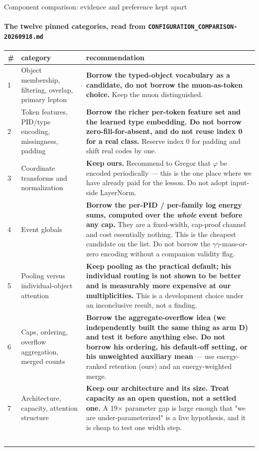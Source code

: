 \documentclass[aspectratio=169,10pt]{beamer}
\begin{document}
\begin{frame}{Component comparison: evidence and preference kept apart}
\framesubtitle{The twelve pinned categories, read from
\texttt{CONFIGURATION\_COMPARISON-20260918.md}}
\begin{center}\tiny
\begin{tabular}{p{0.2cm}p{3.4cm}p{9.4cm}}
\toprule
\# & category & recommendation \\
\midrule
1 & Object membership, filtering, overlap, primary lepton & \textbf{Borrow the typed-object vocabulary as a candidate, do not borrow the muon-as-token choice.} Keep the muon distinguished. \\
2 & Token features, PID/type encoding, missingness, padding & \textbf{Borrow the richer per-token feature set and the learned type embedding. Do not borrow zero-fill-for-absent, and do not reuse index 0 for a real class.} Reserve index 0 for padding and shift real codes by one. \\
3 & Coordinate transforms and normalization & \textbf{Keep ours.} Recommend to Gregor that $\varphi$ be encoded periodically --- this is the one place where we have already paid for the lesson. Do not adopt input-side LayerNorm. \\
4 & Event globals & \textbf{Borrow the per-PID / per-family log energy sums, computed over the \emph{whole} event before any cap.} They are a fixed-width, cap-proof channel and cost essentially nothing. This is the cheapest candidate on the list. Do not borrow the $\gamma$$\gamma$-mass-or-zero encoding without a companion validity flag. \\
5 & Pooling versus individual-object attention & \textbf{Keep pooling as the practical default; his individual routing is not shown to be better and is measurably more expensive at our multiplicities.} This is a development choice under an inconclusive result, not a finding. \\
6 & Caps, ordering, overflow aggregation, merged counts & \textbf{Borrow the aggregate-overflow idea (we independently built the same thing as arm D) and test it before anything else. Do not borrow his ordering, his default-off setting, or his unweighted auxiliary mean} --- use energy-ranked retention (ours) and an energy-weighted merge. \\
7 & Architecture, capacity, attention structure & \textbf{Keep our architecture and its size. Treat capacity as an open question, not a settled one.} A 19$\times$ parameter gap is large enough that "we are under-parameterized" is a live hypothesis, and it is cheap to test one width step. \\
$$
\end{tabular}
\end{center}
\end{frame}
\end{document}
